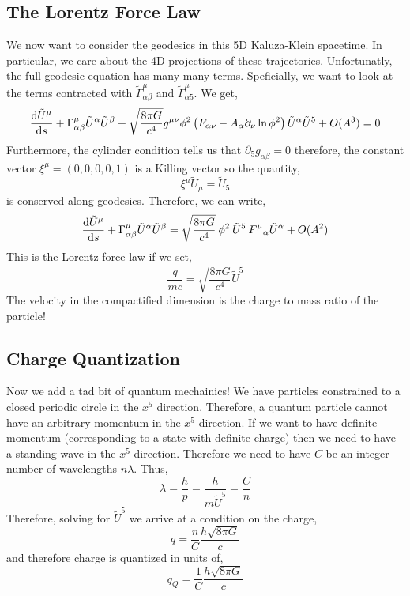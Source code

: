\documentclass[11pt, a4paper]{article}
\begin{document}
\subsection{The Lorentz Force Law}

We now want to consider the geodesics in this 5D Kaluza-Klein spacetime. In particular, we care about the 4D projections of these trajectories. Unfortunatly, the full geodesic equation has many many terms. Speficially, we want to look at the terms contracted with $\tilde{\Gamma}^{\mu}_{\alpha \beta}$ and $\tilde{\Gamma}^{\mu}_{\alpha 5}$. We get,
\[ \frac{\mathrm{d}\tilde{U}^\mu}{\mathrm{d}s} + \Gamma^\mu_{\alpha \beta} \tilde{U}^\alpha \tilde{U}^\beta + \sqrt{\frac{8 \pi G}{c^4}} g^{\mu \nu} \phi^2 \left( F_{\alpha \nu} - A_{\alpha} \partial_{\nu} \ln{\phi^2} \right) \tilde{U}^\alpha \tilde{U}^5 + O(A^3) = 0 \]
Furthermore, the cylinder condition tells us that $\partial_5 g_{\alpha \beta} = 0$ therefore, the constant vector $\xi^\mu = (0, 0, 0, 0, 1)$ is a Killing vector so the quantity,
\[ \xi^\mu \tilde{U}_\mu = \tilde{U}_5 \]
is conserved along geodesics. Therefore, we can write,
\[ \frac{\mathrm{d}\tilde{U}^\mu}{\mathrm{d}s} + \Gamma^\mu_{\alpha \beta} \tilde{U}^\alpha \tilde{U}^\beta = \sqrt{\frac{8 \pi G}{c^4}} \: \phi^2 \: \tilde{U}^5 \: {F^\mu}_{\alpha} \tilde{U}^\alpha + O(A^2) \]
This is the Lorentz force law if we set,
\[ \frac{q}{mc} = \sqrt{\frac{8 \pi G}{c^4}} \tilde{U}^5\]
The velocity in the compactified dimension is the charge to mass ratio of the particle!

\subsection{Charge Quantization}

Now we add a tad bit of quantum mechainics! We have particles constrained to a closed periodic circle in the $x^5$ direction. Therefore, a quantum particle cannot have an arbitrary momentum in the $x^5$ direction. If we want to have definite momentum (corresponding to a state with definite charge) then we need to have a standing wave in the $x^5$ direction. Therefore we need to have $C$ be an integer number of wavelengths $n \lambda$. Thus,
\[ \lambda = \frac{h}{p} = \frac{h}{m \tilde{U}^5} = \frac{C}{n} \]  
Therefore, solving for $\tilde{U}^5$ we arrive at a condition on the charge,
\[ q = \frac{n}{C} \frac{h \sqrt{8 \pi G}}{c}  \]
and therefore charge is quantized in units of,
\[ q_Q = \frac{1}{C} \frac{h \sqrt{8 \pi G}}{c} \]
\end{document}
